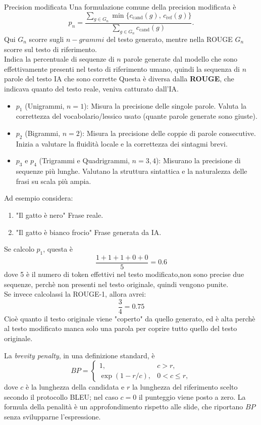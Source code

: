 \begin{definition}{Precision modificata}
Una formulazione comune della precision modificata è
\begin{equation}
p_n=\frac{\sum_{g\in G_n}\min\{c_{\mathrm{cand}}(g),\,c_{\mathrm{ref}}(g)\}}
{\sum_{g\in G_n}c_{\mathrm{cand}}(g)}.
\end{equation}
Qui $G_n$ scorre sugli $n-grammi$ del testo generato, mentre nella ROUGE $G_n$ scorre sul testo di riferimento.\\

Indica la percentuale di sequenze di $n$ parole generate dal modello che sono effettivamente presenti nel testo di riferimento umano, quindi la sequenza di $n$ parole del testo IA che  sono corrette 
Questa è diversa dalla \textbf{ROUGE}, che indicava quanto del testo reale, veniva catturato dall'IA.
\begin{itemize}
    \item $p_1$ (Unigrammi, $n=1$): Misura la precisione delle singole parole. Valuta la correttezza del vocabolario/lessico usato (quante parole generate sono giuste).
    \item $p_2$ (Bigrammi, $n=2$): Misura la precisione delle coppie di parole consecutive. Inizia a valutare la fluidità locale e la correttezza dei sintagmi brevi. 
    \item $p_3$ e $p_4$ (Trigrammi e Quadrigrammi, $n=3, 4$): Misurano la precisione di sequenze più lunghe. Valutano la struttura sintattica e la naturalezza delle frasi su scala più ampia.  
\end{itemize}
Ad esempio considera:
\begin{enumerate}
    \item "Il gatto è nero" Frase reale.
    \item "Il gatto è bianco frocio" Frase generata da IA.
\end{enumerate}
Se calcolo $p_1$, questa è
$$
\frac{1+1+1+0+0}{5} = 0.6
$$
dove 5 è il numero di token effettivi nel testo modificato,non sono precise due sequenze, perchè non presenti nel testo originale, quindi vengono punite.
\\
Se invece calcolassi la ROUGE-1, allora avrei:
$$
\frac{3}{4} = 0.75
$$
Cioè quanto il testo originale viene "coperto" da quello generato, ed è alta perchè al testo modificato manca solo una parola per coprire tutto quello del testo originale.
\end{definition}

La \emph{brevity penalty}, in una definizione standard, è
\begin{equation}
BP=\begin{cases}
1, & c>r,\\
\exp(1-r/c), & 0<c\leq r,
\end{cases}
\end{equation}
dove $c$ è la lunghezza della candidata e $r$ la lunghezza del riferimento scelto secondo il protocollo BLEU; nel caso $c=0$ il punteggio viene posto a zero. La formula della penalità è un approfondimento rispetto alle slide, che riportano $BP$ senza svilupparne l'espressione.

